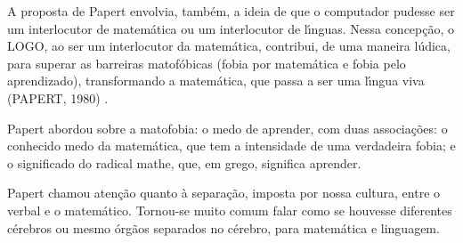 \documentclass[
12pt,		%
openright,	%
twoside,  %
a4paper,			%
chapter=TITLE,		%
english,			%
french,				%
spanish,			%
brazil				%
]{USPSC-classe/USPSC}
\begin{document}
A proposta de Papert envolvia, tamb\'em, a ideia de que o computador pudesse ser um interlocutor  de matem\'atica ou um interlocutor de l\'{\i}nguas. Nessa concep\c{c}\~ao, o LOGO, ao ser um interlocutor da matem\'atica, contribui, de uma maneira l\'udica, para superar as barreiras matof\'obicas (fobia por matem\'atica e fobia pelo aprendizado), transformando a matem\'atica, que passa a ser uma l\'{\i}ngua viva (PAPERT, 1980) .









Papert abordou sobre a \textquotedbl matofobia: o medo de aprender\textquotedbl , com duas associa\c{c}\~oes: o conhecido medo da matem\'atica, que tem a intensidade de uma verdadeira fobia; e o  significado do radical mathe, que, em grego, significa aprender.










\noindent\begin{center}\mbox{\centering{}}\end{center}


Papert chamou aten\c{c}\~ao quanto \`a separa\c{c}\~ao, imposta por nossa cultura, entre o verbal e o matem\'atico. Tornou-se muito comum falar como se houvesse diferentes c\'erebros ou mesmo \'org\~aos separados no c\'erebro, para matem\'atica e linguagem.
\end{document}

